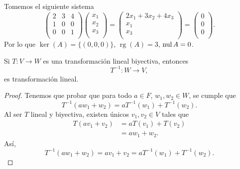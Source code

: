 \documentclass[12pt,a4paper]{book}
\DeclareMathOperator{\rg}{rg}
\newcommand{\llaves}[1]{\{#1\}}
\begin{document}
    \begin{ejemplo}
        Tomemos el siguiente sistema
        \begin{equation*}
            \begin{pmatrix}
                2 & 3 & 4\\
                1 & 0 & 0\\
                0 & 0 & 1\\
            \end{pmatrix}
            \begin{pmatrix}
                x_1\\
                x_2\\
                x_3\\
            \end{pmatrix}
            =
            \begin{pmatrix}
                2x_1 + 3x_2 + 4x_3\\
                x_1\\
                x_3\\
            \end{pmatrix}
            =
            \begin{pmatrix}
                0\\
                0\\
                0\\
            \end{pmatrix}.
        \end{equation*}
        Por lo que $\ker(A) = \llaves{(0, 0, 0)}$, $\rg(A) = 3$, $\operatorname{nul}{A} = 0$.
    \end{ejemplo}

    \begin{proposicion}
        Si $T:V \to W$ es una transformación lineal biyectiva, entonces
        \begin{equation*}
            T^{-1}:W\to V,
        \end{equation*}
        es transformación lineal.
    \end{proposicion}

    \begin{proof}
        Tenemos que probar que para todo $a \in F$, $w_1, w_2 \in W$, se cumple que
        \begin{equation*}
            T^{-1}(aw_1 + w_2) = a T^{-1}(w_1) + T^{-1}(w_2).
        \end{equation*}
        Al ser $T$ lineal y biyectiva, existen únicos $v_1, v_2 \in V$ tales que
        \begin{align*}
            T(av_1 + v_2) & = aT(v_1) + T(v_2)\\
            & = aw_1 + w_2.
        \end{align*}
        Así,
        \begin{equation*}
            T^{-1}(aw_1 + w_2) = av_1 + v_2 = aT^{-1}(w_1)  + T^{-1}(w_2).
        \end{equation*}
    \end{proof}
\end{document}
